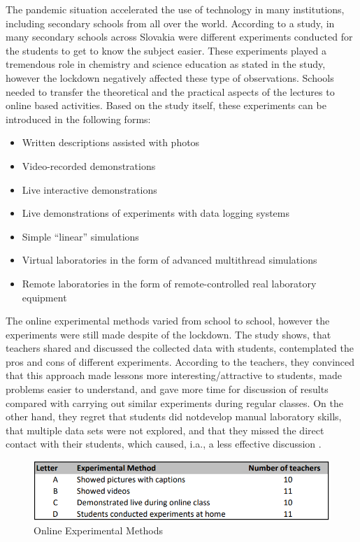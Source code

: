 \documentclass[10pt,oneside,english,a4paper]{article}
\begin{document}
	The pandemic situation accelerated the use of technology in many institutions, including secondary schools from all over the world. According to a study\cite{Babinkov2020}, in many secondary schools across Slovakia were different experiments conducted for the students to get to know the subject easier. These experiments played a tremendous role in chemistry and science education as stated in the study, however the lockdown negatively affected these type of observations. Schools needed to transfer the theoretical and the practical aspects of the lectures to online based activities. Based on the study itself\cite{Babinkov2020}, these experiments can be introduced in the following forms:
\begin{itemize}
\item Written descriptions assisted with photos
\item Video-recorded demonstrations
\item Live interactive demonstrations
\item Live demonstrations of experiments with data logging systems
\item Simple “linear” simulations
\item Virtual laboratories in the form of advanced multithread simulations
\item Remote laboratories in the form of remote-controlled real laboratory equipment
\end{itemize}

	The online experimental methods varied from school to school, however the experiments were still made despite of the lockdown. The study shows, that teachers shared and discussed the collected data with students, contemplated the pros and cons of different experiments. According to the teachers, they convinced that this approach made lessons more interesting/attractive to students, made problems easier to understand, and gave more time for discussion of results  compared with carrying out similar experiments during regular classes. On the other hand, they regret that students did notdevelop manual laboratory skills, that multiple data sets were not explored, and that they missed the direct contact with their students, which caused, i.a., a less effective discussion \cite{Babinkov2020}.

\begin{figure}[tbh]
\centering
\includegraphics[scale=.6]{coronavirus_1.png}
\caption{Online Experimental Methods\cite{Babinkov2020}}
\label{f:rozhod}
\end{figure}
\end{document}
